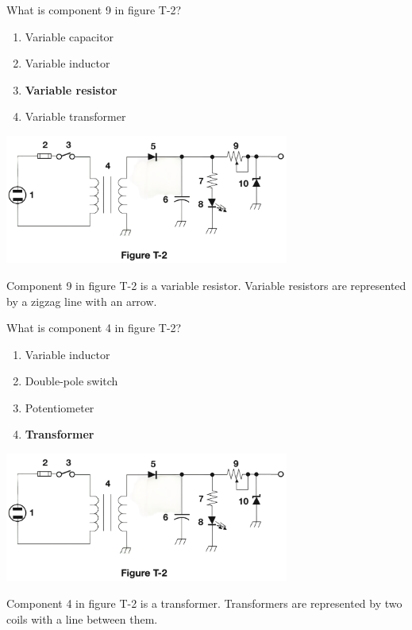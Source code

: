 \begin{tcolorbox}[
    colback=gray!10!white,
    colframe=black!75!black,
    title={T6C08},
    sidebyside,
    sidebyside align=top,
    lefthand width=0.45\textwidth
]
What is component 9 in figure T-2?
\begin{enumerate}[label=\Alph*),noitemsep]
    \item Variable capacitor
    \item Variable inductor
    \item \textbf{Variable resistor}
    \item Variable transformer
\end{enumerate}
\tcblower
\includegraphics[width=0.7\textwidth]{tech/images/t2.png}
\end{tcolorbox}
Component 9 in figure T-2 is a variable resistor. Variable resistors are represented by a zigzag line with an arrow.

\begin{tcolorbox}[
    colback=gray!10!white,
    colframe=black!75!black,
    title={T6C09},
    sidebyside,
    sidebyside align=top,
    lefthand width=0.45\textwidth
]
What is component 4 in figure T-2?
\begin{enumerate}[label=\Alph*),noitemsep]
    \item Variable inductor
    \item Double-pole switch
    \item Potentiometer
    \item \textbf{Transformer}
\end{enumerate}
\tcblower
\includegraphics[width=0.7\textwidth]{tech/images/t2.png}
\end{tcolorbox}
Component 4 in figure T-2 is a transformer. Transformers are represented by two coils with a line between them.

